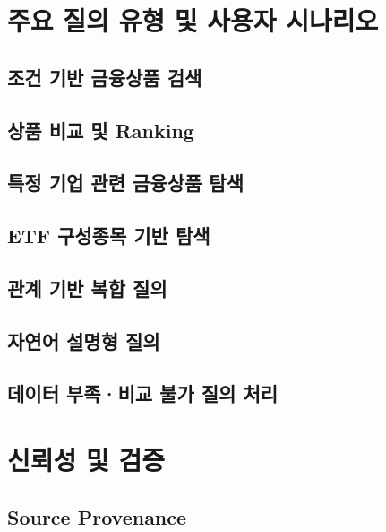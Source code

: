 \documentclass[11pt,a4paper]{article}
\begin{document}

\section{주요 질의 유형 및 사용자 시나리오}

\subsection{조건 기반 금융상품 검색}


\subsection{상품 비교 및 Ranking}


\subsection{특정 기업 관련 금융상품 탐색}


\subsection{ETF 구성종목 기반 탐색}


\subsection{관계 기반 복합 질의}


\subsection{자연어 설명형 질의}


\subsection{데이터 부족·비교 불가 질의 처리}


\section{신뢰성 및 검증}

\subsection{Source Provenance}
\end{document}
